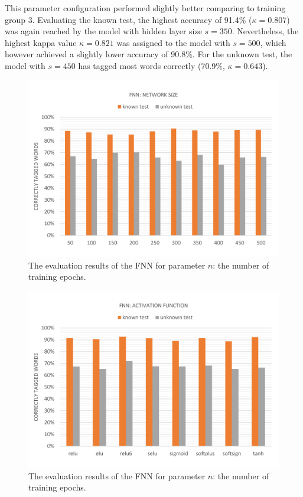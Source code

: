 This parameter configuration performed slightly better comparing to training group 3. Evaluating the known test, the highest accuracy of 91.4\% ($\kappa=0.807$) was again reached by the model with hidden layer size $s=350$. Nevertheless, the highest kappa value $\kappa=0.821$ was assigned to the model with $s=500$, which however achieved a slightly lower accuracy of 90.8\%. For the unknown test, the model with $s=450$ has tagged most words correctly (70.9\%, $\kappa=0.643$).

\begin{figure}[H]
	\hspace{-5mm}\includegraphics[width=1.07\textwidth]{images/evaluation_fnn_es}
	\caption[FNN Evaluation: Network Size]{The evaluation results of the FNN for parameter $n$: the number of training epochs.}
	\label{f.evaluation.fnn.es}
\end{figure}

\begin{figure}[H]
	\hspace{-5mm}\includegraphics[width=1.07\textwidth]{images/evaluation_fnn_a}
	\caption[FNN Evaluation: Number of Training Epochs]{The evaluation results of the FNN for parameter $n$: the number of training epochs.}
	\label{f.evaluation.fnn.a}
\end{figure}

